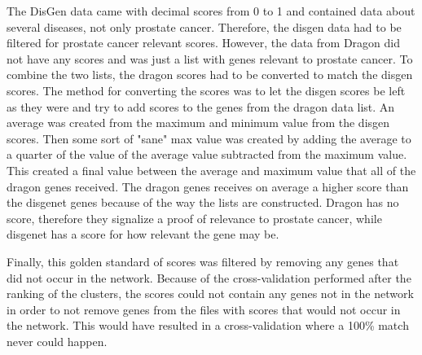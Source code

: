 The DisGen data came with decimal scores from 0 to 1 and contained data about
several diseases, not only prostate cancer. Therefore, the disgen data had to be
filtered for prostate cancer relevant scores. However, the data from Dragon did
not have any scores and was just a list with genes relevant to prostate cancer.
To combine the two lists, the dragon scores had to be converted to match the
disgen scores. The method for converting the scores was to let the disgen scores
be left as they were and try to add scores to the genes from the dragon data
list. An average was created from the maximum and minimum value from the disgen
scores. Then some sort of "sane" max value was created by adding the average to
a quarter of the value of the average value subtracted from the maximum value.
This created a final value between the average and maximum value that all of the
dragon genes received. The dragon genes receives on average a higher score than
the disgenet genes because of the way the lists are constructed. Dragon has no
score, therefore they signalize a proof of relevance to prostate cancer, while
disgenet has a score for how relevant the gene may be.

Finally, this golden standard of scores was filtered by removing any genes that
did not occur in the network. Because of the cross-validation performed after
the ranking of the clusters, the scores could not contain any genes not in the
network in order to not remove genes from the files with scores that would not
occur in the network. This would have resulted in a cross-validation where
a 100\% match never could happen.

